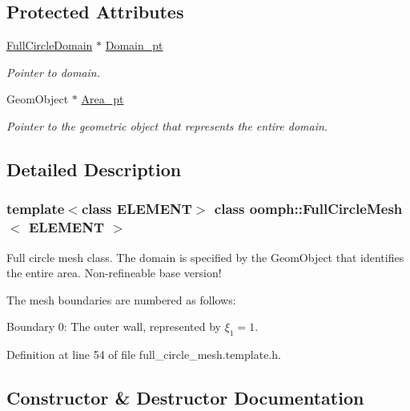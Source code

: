 \subsection*{Protected Attributes}
\begin{DoxyCompactItemize}
\item 
\hyperlink{classoomph_1_1FullCircleDomain}{Full\+Circle\+Domain} $\ast$ \hyperlink{classoomph_1_1FullCircleMesh_a042c0729727a71bee0660f44c33f8691}{Domain\+\_\+pt}
\begin{DoxyCompactList}\small\item\em Pointer to domain. \end{DoxyCompactList}\item 
Geom\+Object $\ast$ \hyperlink{classoomph_1_1FullCircleMesh_a0eb9088080115746b8570264f444c37f}{Area\+\_\+pt}
\begin{DoxyCompactList}\small\item\em Pointer to the geometric object that represents the entire domain. \end{DoxyCompactList}\end{DoxyCompactItemize}


\subsection{Detailed Description}
\subsubsection*{template$<$class E\+L\+E\+M\+E\+NT$>$\newline
class oomph\+::\+Full\+Circle\+Mesh$<$ E\+L\+E\+M\+E\+N\+T $>$}

Full circle mesh class. The domain is specified by the Geom\+Object that identifies the entire area. Non-\/refineable base version! 

The mesh boundaries are numbered as follows\+:
\begin{DoxyItemize}
\item Boundary 0\+: The outer wall, represented by $\xi_1 = 1$.
\end{DoxyItemize}

Definition at line 54 of file full\+\_\+circle\+\_\+mesh.\+template.\+h.



\subsection{Constructor \& Destructor Documentation}
\mbox{\label{classoomph_1_1FullCircleMesh_acf4dee3c3072751597d7897176b1e7f1}} 
